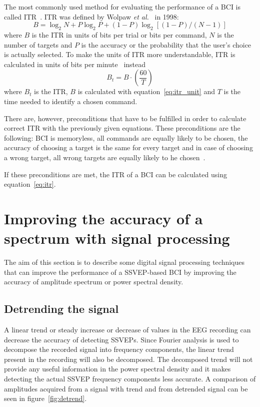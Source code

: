 The most commonly used method for evaluating the performance of a \gls{BCI} is called \gls{ITR}~\cite{itr}. \gls{ITR} was defined by Wolpaw \textit{et al.}~\cite{itr_wolpaw} in 1998:
\begin{equation}
	\label{eq:itr_unit}
	B=\log_2 N+ P\log_2 P +(1-P)\log_2[(1-P)/(N-1)]
\end{equation}
where $B$ is the \gls{ITR} in units of bits per trial or bits per command, $N$ is the number of targets and $P$ is the accuracy or the probability that the user's choice is actually selected. To make the units of \gls{ITR} more understandable, \gls{ITR} is calculated in units of bits per minute~\cite{itr_wolpaw} instead
\begin{equation}
	\label{eq:itr}
	B_t=B\cdot(\frac{60}{T})
\end{equation}
where $B_t$ is the \gls{ITR}, $B$ is calculated with equation~\ref{eq:itr_unit} and $T$ is the time needed to identify a chosen command.

There are, however, preconditions that have to be fulfilled in order to calculate correct \gls{ITR} with the previously given equations. These preconditions are the following: \gls{BCI} is memoryless, all commands are equally likely to be chosen, the accuracy of choosing a target is the same for every target and in case of choosing a wrong target, all wrong targets are equally likely to he chosen~\cite{itr}.

If these preconditions are met, the \gls{ITR} of a \gls{BCI} can be calculated using equation~\ref{eq:itr}.

\section{Improving the accuracy of a spectrum with signal processing}

The aim of this section is to describe some digital signal processing techniques that can improve the performance of a \gls{SSVEP}-based \gls{BCI} by improving the accuracy of amplitude spectrum or \gls{power spectral density}.

\subsection{Detrending the signal}

A linear trend or steady increase or decrease of values in the \gls{EEG} recording can decrease the accuracy of detecting \glspl{SSVEP}. Since Fourier analysis is used to decompose the recorded signal into \glspl{frequency component}, the linear trend present in the recording will also be decomposed. The decomposed trend will not provide any useful information in the \gls{power spectral density} and it makes detecting the actual \gls{SSVEP} \glspl{frequency component} less accurate. A comparison of amplitudes acquired from a signal with trend and from detrended signal can be seen in figure~\ref{fig:detrend}.

